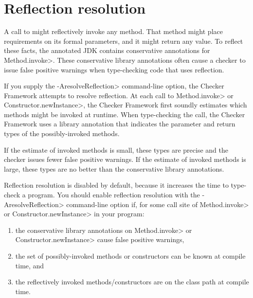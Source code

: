 \htmlhr

\def\reflectionAnno#1#2{\refqualclass{common/reflection/qual}{#1}\code{#2}}


\chapter{Reflection resolution\label{reflection-resolution}}

A call to
might reflectively invoke any method.  That method might place requirements
on its formal parameters, and it might return any value.  To reflect these
facts, the annotated JDK contains
conservative annotations for \<Method.invoke>.
These conservative library annotations often cause a checker to issue false
positive warnings when type-checking code that uses reflection.

If you supply the \<-AresolveReflection> command-line option, the Checker
Framework attempts to resolve reflection.  At each call to \<Method.invoke>
or \<Constructor.newInstance>, the Checker Framework first soundly estimates
which methods might be invoked at runtime.  When type-checking the call, the
Checker Framework uses a library annotation that indicates the parameter
and return types of the possibly-invoked methods.

If the estimate of invoked methods is small, these types are precise and
the checker issues fewer false positive warnings.
If the estimate of invoked methods is large, these types are no better than the
conservative library annotations.

Reflection resolution is disabled by default, because it increases the time
to type-check a program.
You should enable reflection resolution with the \<-AresolveReflection>
command-line option if, for some call site of \<Method.invoke> or
\<Constructor.newInstance> in your program:
\begin{enumerate}
\item
  the conservative library annotations on \<Method.invoke> or
  \<Constructor.newInstance> cause false positive warnings,
\item
  the set of possibly-invoked methods or constructors can be known at
  compile time,
  and
\item
  the reflectively invoked methods/constructors are on the class path at
  compile time.
\end{enumerate}

